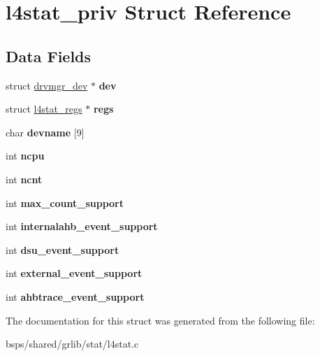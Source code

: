 \hypertarget{structl4stat__priv}{}\section{l4stat\+\_\+priv Struct Reference}
\label{structl4stat__priv}
\subsection*{Data Fields}
\begin{DoxyCompactItemize}
\item 
\mbox{\label{structl4stat__priv_a1158b9ed7fccb7263ce358db8876b607}} 
struct \mbox{\hyperlink{structdrvmgr__dev}{drvmgr\+\_\+dev}} $\ast$ {\bfseries dev}
\item 
\mbox{\label{structl4stat__priv_accd94514b60b771cda98ff04380f3f18}} 
struct \mbox{\hyperlink{structl4stat__regs}{l4stat\+\_\+regs}} $\ast$ {\bfseries regs}
\item 
\mbox{\label{structl4stat__priv_ad8a5c99504ab6b34403cf77af434074e}} 
char {\bfseries devname} \mbox{[}9\mbox{]}
\item 
\mbox{\label{structl4stat__priv_a4e3874b06603fe335a9c68e54ec0053d}} 
int {\bfseries ncpu}
\item 
\mbox{\label{structl4stat__priv_ada7d533e7776a9597dbed38d1ee8fba0}} 
int {\bfseries ncnt}
\item 
\mbox{\label{structl4stat__priv_aab46873af19ae73f55618dfd03a58a08}} 
int {\bfseries max\+\_\+count\+\_\+support}
\item 
\mbox{\label{structl4stat__priv_a679e816969e2961323c8b1832f8cdc1a}} 
int {\bfseries internalahb\+\_\+event\+\_\+support}
\item 
\mbox{\label{structl4stat__priv_ac78fdcb0789674edc6bcdd0db4bdaf06}} 
int {\bfseries dsu\+\_\+event\+\_\+support}
\item 
\mbox{\label{structl4stat__priv_a5c5ee941e6af710397241b9b77c42eba}} 
int {\bfseries external\+\_\+event\+\_\+support}
\item 
\mbox{\label{structl4stat__priv_abe8329a8faaf81c7e668ea9829d68001}} 
int {\bfseries ahbtrace\+\_\+event\+\_\+support}
\end{DoxyCompactItemize}


The documentation for this struct was generated from the following file\+:\begin{DoxyCompactItemize}
\item 
bsps/shared/grlib/stat/l4stat.\+c\end{DoxyCompactItemize}

